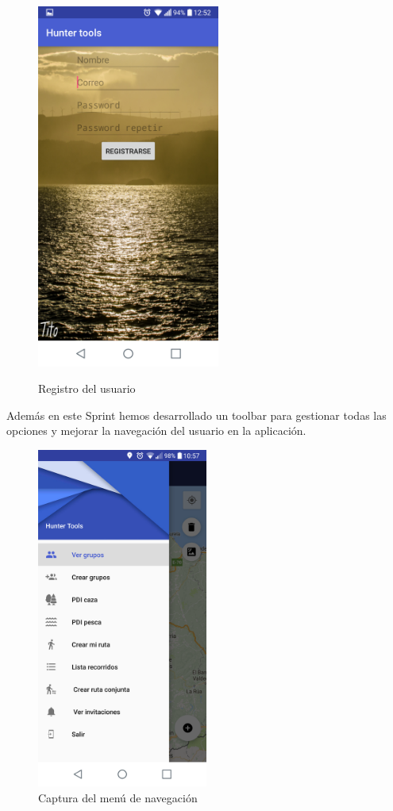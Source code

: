 \begin{figure}[htbp]
\begin{minipage}[b]{0.5\linewidth}
\end{minipage}
\hspace{0.5cm} %
\begin{minipage}[b]{0.5\linewidth}
\centering
\includegraphics[width=6cm]{capturamovil/registro.png}
 \label{figura2}
\caption{Registro del usuario }

\end{minipage}
\end{figure}
Además en este Sprint hemos desarrollado un toolbar para gestionar todas las opciones y mejorar la navegación del usuario en la aplicación.
\begin{figure}[H]
		\centering
		\includegraphics[width=0.5\textwidth] {capturamovil/opciones}
		\caption{Captura del menú de navegación}
	\end{figure}

